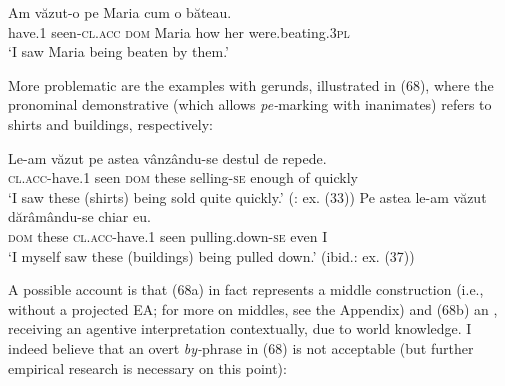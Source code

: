 \documentclass[output=paper]{langsci/langscibook}
\begin{document}
\ea%
    \label{ex:giurgea:67}
    \gll Am      văzut-o         pe     Maria cum o    băteau.\\
         have.\textsc{1} seen-\textsc{cl.acc} \textsc{dom} Maria how  her were.beating.\textsc{3pl}\\
    \glt ‘I saw Maria being beaten by them.’  
    \z


More problematic are the examples with gerunds, illustrated in (68), where the pronominal demonstrative (which allows \textit{pe-}marking with inanimates) refers to shirts and buildings, respectively: 

\ea%
    \label{ex:giurgea:68}
    \ea
    \gll Le-am              văzut pe    astea vânzându-se destul   de  repede.\\
         \textsc{cl.acc}{}-have.\textsc{1} seen  \textsc{dom} these selling-\textsc{se}      enough of  quickly      \\
    \glt ‘I saw these (shirts) being sold quite quickly.’ (\citealt{Cornilescu1998}: ex. (33))
    \ex
    \gll  Pe   astea  le-am               văzut dărâmându-se      chiar eu. \\
          \textsc{dom} these \textsc{cl.acc-}have.\textsc{1} seen  pulling.down-\textsc{se} even I     \\
    \glt ‘I myself saw these (buildings) being pulled down.’ (ibid.: ex. (37))
    \z
\z    

A possible account is that (68a) in fact represents a middle construction (i.e., without a projected EA; for more on middles, see the Appendix) and (68b) an , receiving an agentive interpretation contextually, due to world knowledge. I indeed believe that an overt \textit{by-}phrase in (68) is not acceptable (but further empirical research is necessary on this point):

    \z
\end{document}

